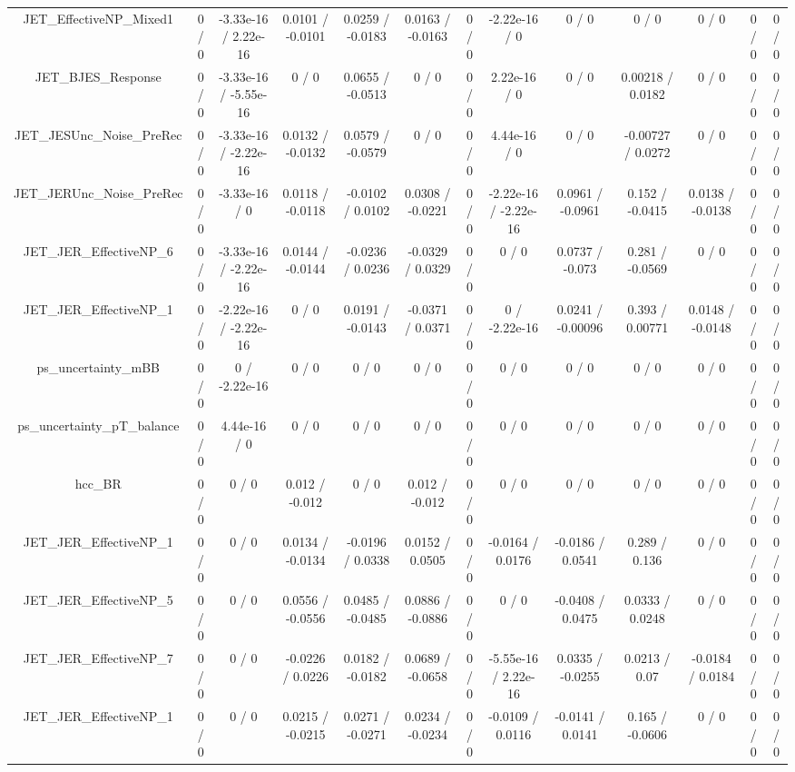 \documentclass[10pt]{article}
\begin{document}
\begin{table}[htbp]
\begin{center}
\begin{tabular}{|c|c|c|c|c|c|c|c|c|c|c|c|c|}
  JET_EffectiveNP_Mixed1 & 0 / 0 & -3.33e-16 / 2.22e-16 & 0.0101 / -0.0101 & 0.0259 / -0.0183 & 0.0163 / -0.0163 & 0 / 0 & -2.22e-16 / 0 & 0 / 0 & 0 / 0 & 0 / 0 & 0 / 0 & 0 / 0 \\ 
  JET_BJES_Response & 0 / 0 & -3.33e-16 / -5.55e-16 & 0 / 0 & 0.0655 / -0.0513 & 0 / 0 & 0 / 0 & 2.22e-16 / 0 & 0 / 0 & 0.00218 / 0.0182 & 0 / 0 & 0 / 0 & 0 / 0 \\ 
  JET_JESUnc_Noise_PreRec & 0 / 0 & -3.33e-16 / -2.22e-16 & 0.0132 / -0.0132 & 0.0579 / -0.0579 & 0 / 0 & 0 / 0 & 4.44e-16 / 0 & 0 / 0 & -0.00727 / 0.0272 & 0 / 0 & 0 / 0 & 0 / 0 \\ 
  JET_JERUnc_Noise_PreRec & 0 / 0 & -3.33e-16 / 0 & 0.0118 / -0.0118 & -0.0102 / 0.0102 & 0.0308 / -0.0221 & 0 / 0 & -2.22e-16 / -2.22e-16 & 0.0961 / -0.0961 & 0.152 / -0.0415 & 0.0138 / -0.0138 & 0 / 0 & 0 / 0 \\ 
  JET_JER_EffectiveNP_6 & 0 / 0 & -3.33e-16 / -2.22e-16 & 0.0144 / -0.0144 & -0.0236 / 0.0236 & -0.0329 / 0.0329 & 0 / 0 & 0 / 0 & 0.0737 / -0.073 & 0.281 / -0.0569 & 0 / 0 & 0 / 0 & 0 / 0 \\ 
  JET_JER_EffectiveNP_1 & 0 / 0 & -2.22e-16 / -2.22e-16 & 0 / 0 & 0.0191 / -0.0143 & -0.0371 / 0.0371 & 0 / 0 & 0 / -2.22e-16 & 0.0241 / -0.00096 & 0.393 / 0.00771 & 0.0148 / -0.0148 & 0 / 0 & 0 / 0 \\ 
  ps_uncertainty_mBB & 0 / 0 & 0 / -2.22e-16 & 0 / 0 & 0 / 0 & 0 / 0 & 0 / 0 & 0 / 0 & 0 / 0 & 0 / 0 & 0 / 0 & 0 / 0 & 0 / 0 \\ 
  ps_uncertainty_pT_balance & 0 / 0 & 4.44e-16 / 0 & 0 / 0 & 0 / 0 & 0 / 0 & 0 / 0 & 0 / 0 & 0 / 0 & 0 / 0 & 0 / 0 & 0 / 0 & 0 / 0 \\ 
  hcc_BR & 0 / 0 & 0 / 0 & 0.012 / -0.012 & 0 / 0 & 0.012 / -0.012 & 0 / 0 & 0 / 0 & 0 / 0 & 0 / 0 & 0 / 0 & 0 / 0 & 0 / 0 \\ 
  JET_JER_EffectiveNP_1 & 0 / 0 & 0 / 0 & 0.0134 / -0.0134 & -0.0196 / 0.0338 & 0.0152 / 0.0505 & 0 / 0 & -0.0164 / 0.0176 & -0.0186 / 0.0541 & 0.289 / 0.136 & 0 / 0 & 0 / 0 & 0 / 0 \\ 
  JET_JER_EffectiveNP_5 & 0 / 0 & 0 / 0 & 0.0556 / -0.0556 & 0.0485 / -0.0485 & 0.0886 / -0.0886 & 0 / 0 & 0 / 0 & -0.0408 / 0.0475 & 0.0333 / 0.0248 & 0 / 0 & 0 / 0 & 0 / 0 \\ 
  JET_JER_EffectiveNP_7 & 0 / 0 & 0 / 0 & -0.0226 / 0.0226 & 0.0182 / -0.0182 & 0.0689 / -0.0658 & 0 / 0 & -5.55e-16 / 2.22e-16 & 0.0335 / -0.0255 & 0.0213 / 0.07 & -0.0184 / 0.0184 & 0 / 0 & 0 / 0 \\ 
  JET_JER_EffectiveNP_1 & 0 / 0 & 0 / 0 & 0.0215 / -0.0215 & 0.0271 / -0.0271 & 0.0234 / -0.0234 & 0 / 0 & -0.0109 / 0.0116 & -0.0141 / 0.0141 & 0.165 / -0.0606 & 0 / 0 & 0 / 0 & 0 / 0 \\ 

\end{tabular}
\end{center}
\end{table}
\end{document}
